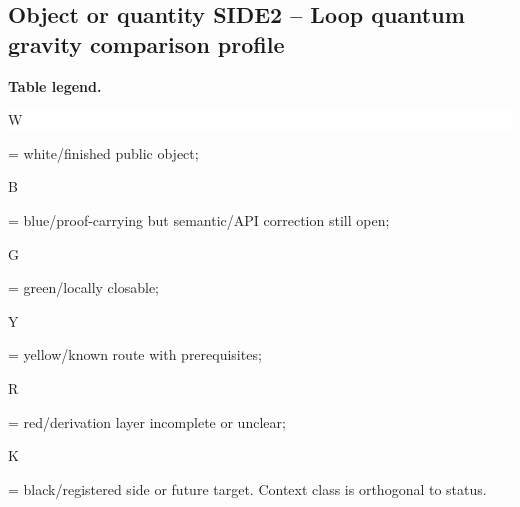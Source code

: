 \subsection*{Object or quantity SIDE2 -- Loop quantum gravity comparison profile}
\hypertarget{objproof:SIDE2}{}
\par\smallskip\noindent\begin{minipage}{0.99\linewidth}\footnotesize\raggedright\textbf{Table legend.} \colorbox{white}{\strut W} = white/finished public object; \colorbox{cyan!20}{\strut B} = blue/proof-carrying but semantic/API correction still open; \colorbox{green!18}{\strut G} = green/locally closable; \colorbox{yellow!25}{\strut Y} = yellow/known route with prerequisites; \colorbox{red!20}{\strut R} = red/derivation layer incomplete or unclear; \colorbox{black!18}{\strut K} = black/registered side or future target. Context class is orthogonal to status.\end{minipage}\par\vspace{0.25em}
